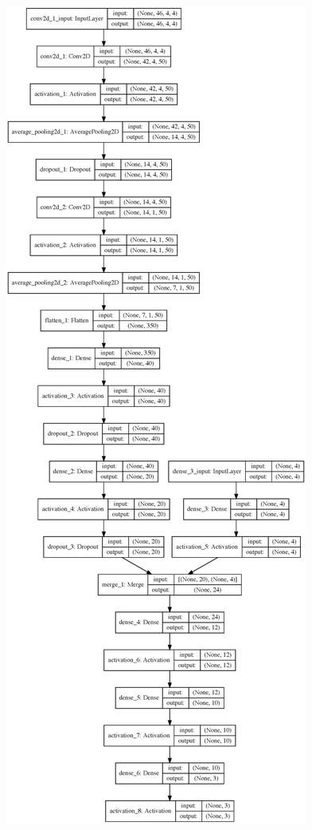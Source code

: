 \begin{figure}
  \includegraphics{Figures/Chapter5/SNAGNNoise}
  \caption{}
  \label{fig:AGNNoiseROC}
\end{figure}

